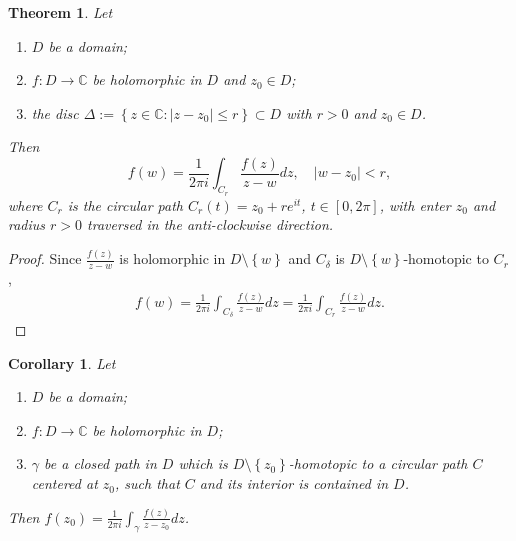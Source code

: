 \documentclass[12pt,openany]{book}
\newtheorem{theorem}{Theorem}[chapter]
\newtheorem{corollary}{Corollary}[theorem]
\theoremstyle{definition}
\newcommand{\set}[1]{\left\{#1\right\}}
\newcommand{\C}{\mathbb{C}}
\newcommand{\of}[1]{\left( #1 \right)}
\newcommand{\abs}[1]{\left\lvert #1 \right\rvert}
\begin{document}
	\begin{tcolorbox}[colback=white,colframe=thmcolor,arc=5pt,title={\color{white}\bf The Cauchy Integral Formula for Circular Paths}]
		\begin{theorem}
			Let \begin{enumerate}[(1)]
				\item $D$ be a domain;
				\item $f:D\to\C$ be holomorphic in $D$ and $z_0\in D$;
				\item the disc $\Delta:=\set{z\in\C:\abs{z-z_0}\leq r}\subset D$ with $r>0$ and $z_0\in D$.
			\end{enumerate} Then \[
			f\of{w}=\frac{1}{2\pi i}\int_{C_r}\frac{f\of{z}}{z-w}dz,\quad \abs{w-z_0}<r,
			\] where $C_r$ is the circular path $C_r\of{t}=z_0+re^{it}$, $t\in[0,2\pi]$, with enter $z_0$ and radius $r>0$ traversed in the anti-clockwise direction.
		\end{theorem}
	\end{tcolorbox}
	\begin{proof}
		Since $\displaystyle\frac{f\of{z}}{z-w
		}$ is holomorphic in $D\setminus\set{w}$ and $C_\delta$ is $D\setminus\set{w}$-homotopic to $C_{r}$,
		\begin{align*}
			f\of{w}=\frac{1}{2\pi i}\int_{C_\delta}\frac{f\of{z}}{z-w}dz=\frac{1}{2\pi i}\int_{C_r}\frac{f\of{z}}{z-w}dz.
		\end{align*}
	\end{proof}
	
	\begin{tcolorbox}[colback=white,colframe=corcolor,arc=5pt,title={\color{white}\bf The Cauchy Integral Formula for General Paths}]
		\begin{corollary}
			Let \begin{enumerate}[(1)]
				\item $D$ be a domain;
				\item $f:D\to\C$ be holomorphic in $D$;
				\item $\gamma$ be a closed path in $D$ which is $D\setminus\set{z_0}$-homotopic to a circular path $C$ centered at $z_0$, such that $C$ and its interior is contained in $D$.
			\end{enumerate} Then $\displaystyle f\of{z_0}=\frac{1}{2\pi i}\int_\gamma\frac{f\of{z}}{z-z_0}dz$.
		\end{corollary}
	\end{tcolorbox}
	
	\newpage
\end{document}
